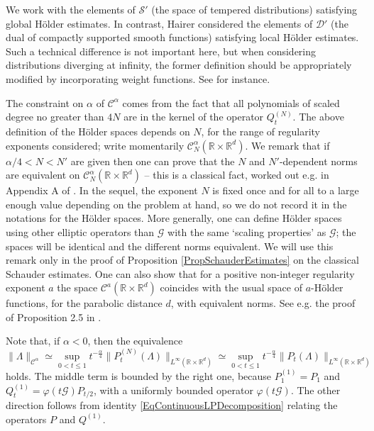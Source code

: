 \documentclass[10pt, reqno]{amsart}
\numberwithin{subsection}{section}
\numberwithin{subsubsection}{subsection}
\numberwithin{equation}{section} %
\theoremstyle{mystyle}
\theoremstyle{mystyle2}
\theoremstyle{mystyle3}
\newcommand{\ssk}{\smallskip}
\newcommand\bbR{\mathbb{R}}
\newcommand{\mcC}{\mathcal{C}}
\newcommand{\mcD}{\mathcal{D}}
\newcommand{\mcG}{\mathcal{G}}
\newcommand\mcS{\mathcal{S}}
\begin{document}
\ssk

We work with the elements of $\mcS'$ (the space of tempered distributions) satisfying global H\"older estimates.
In contrast, Hairer \cite{Hai14} considered the elements of $\mcD'$ (the dual of compactly supported smooth functions) satisfying local H\"older estimates.
Such a technical difference is not important here, but when considering distributions diverging at infinity, the former definition should be appropriately modified by incorporating weight functions. See \cite{BH23} for instance.

The constraint on $\alpha$ of $\mcC^\alpha$ comes from the fact that all polynomials of scaled degree no greater than $4N$ are in the kernel of the operator $Q_t^{(N)}$. The above definition of the H\"older spaces depends on $N$, for the range of regularity exponents considered; write momentarily $\mcC^\alpha_N(\bbR\times\bbR^d)$. We remark that if $\alpha/4<N<N'$ are given then one can prove that the $N$ and $N'$-dependent norms are equivalent on $\mcC^\alpha_N(\bbR\times\bbR^d)$ -- this is a classical fact, worked out e.g. in Appendix {\sf A} of \cite{BB1}. In the sequel, the exponent $N$ is fixed once and for all to a large enough value depending on the problem at hand, so we do not record it in the notations for the H\"older spaces. More generally, one can define H\"older spaces using other elliptic operators than $\mcG$ with the same `scaling properties' as $\mcG$; the spaces will be identical and the different norms equivalent. We will use this remark only in the proof of Proposition \ref{PropSchauderEstimates} on the classical Schauder estimates. One can also show that for a positive non-integer regularity exponent $a$ the space $\mcC^a(\bbR\times\bbR^d)$ coincides with the usual space of $a$-H\"older functions, for the parabolic distance $d$, with equivalent norms. See e.g. the proof of Proposition 2.5 in \cite{BB1}.

\ssk

Note that, if $\alpha<0$, then the equivalence
\begin{equation} \label{EqEquivalentNegativeHolderNorm}
\|\Lambda\|_{\mcC^\alpha} \simeq \sup_{0<t\le1}t^{-\frac\alpha{4}} \big\|P^{(N)}_t(\Lambda)\big\|_{L^\infty(\bbR\times\bbR^d)} \simeq \sup_{0<t\le1}t^{-\frac\alpha{4}} \|P_t(\Lambda)\|_{L^\infty(\bbR\times\bbR^d)}
\end{equation}
holds. The middle term is bounded by the right one, because $P_1^{(1)}=P_1$ and $Q_t^{(1)}=\varphi(t\mcG)P_{t/2}$, with a uniformly bounded 
operator $\varphi(t\mcG)$. The other direction follows from identity \eqref{EqContinuousLPDecomposition} relating the operators $P$ and $Q^{(1)}$. 
\end{document}
